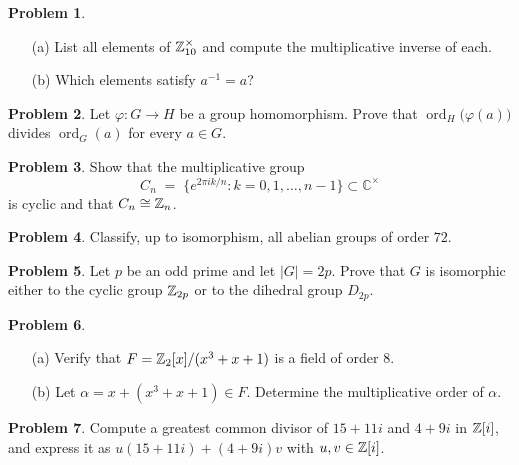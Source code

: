 \documentclass[12pt]{article}
\theoremstyle{definition} %
\newtheorem{problem}{Problem}
\theoremstyle{plain} %
\begin{document}
\bigskip
\begin{problem}
  \begin{enumerate}
      \item[(a)] List all elements of \(\mathbb Z_{10}^{\times}\) and
                compute the multiplicative inverse of each.
      \item[(b)] Which elements satisfy \(a^{-1}=a\)?
  \end{enumerate}
\end{problem}

\bigskip
\begin{problem}
  Let \(\varphi:G\to H\) be a group homomorphism.
  Prove that \(\operatorname{ord}_{H}\!\bigl(\varphi(a)\bigr)\)
  divides \(\operatorname{ord}_{G}(a)\) for every \(a\in G\).
\end{problem}

\bigskip
\begin{problem}
  Show that the multiplicative group
  \[
      C_{n}
      \;=\;
      \bigl\{e^{2\pi i k/n}:k=0,1,\dots,n-1\bigr\}
      \subset\mathbb{C}^{\times}
  \]
  is cyclic and that \(C_{n}\cong\mathbb Z_{n}\).
\end{problem}

\bigskip
\begin{problem}
  Classify, up to isomorphism, all abelian groups of order \(72\).
\end{problem}

\bigskip
\begin{problem}
  Let \(p\) be an odd prime and let \(|G|=2p\).
  Prove that \(G\) is isomorphic either to the cyclic group
  \(\mathbb Z_{2p}\) or to the dihedral group \(D_{2p}\).
\end{problem}

\bigskip
\begin{problem}
  \begin{enumerate}
      \item[(a)]  Verify that
                  \(F=\mathbb Z_{2}[x]/(x^{3}+x+1)\) is a field of order \(8\).
      \item[(b)] Let \(\alpha=x+(x^{3}+x+1)\in F\).
                Determine the multiplicative order of \(\alpha\).
  \end{enumerate}
\end{problem}

\bigskip
\begin{problem}
  Compute a greatest common divisor of
  \(15+11i\) and \(4+9i\) in \(\mathbb Z[i]\),
  and express it as
  \(u(15+11i)+(4+9i)v\) with \(u,v\in\mathbb Z[i]\).
\end{problem}
\end{document}
